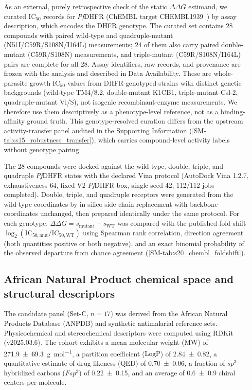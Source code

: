 \documentclass[11pt,a4paper]{article}
\begin{document}
As an external, purely retrospective check of the static $\Delta\Delta G$ estimand, we curated IC$_{50}$ records for \textit{Pf}DHFR (ChEMBL target CHEMBL1939~\citep{zdrazil2024chembl}) by assay description, which encodes the DHFR genotype. The curated set contains 28 compounds with paired wild-type and quadruple-mutant (N51I/C59R/S108N/I164L) measurements; 24 of them also carry paired double-mutant (C59R/S108N) measurements, and triple-mutant (C59R/S108N/I164L) pairs are complete for all 28. Assay identifiers, raw records, and provenance are frozen with the analysis and described in Data Availability. These are whole-parasite growth IC$_{50}$ values from DHFR-genotyped strains with distinct genetic backgrounds (wild-type TM4/8.2, double-mutant K1CB1, triple-mutant Csl-2, quadruple-mutant Vl/S), not isogenic recombinant-enzyme measurements. We therefore use them descriptively as a phenotype-level reference, not as a binding-affinity ground truth. This genotype-resolved curation differs from the upstream activity-transfer panel audited in the Supporting Information (\cref{SM-tab:s15_robustness_transfer}), which carries compound-level activity labels without genotype pairing.

The 28 compounds were docked against the wild-type, double, triple, and quadruple \textit{Pf}DHFR states with the declared Vina protocol (AutoDock Vina 1.2.7, exhaustiveness \num{64}, fixed V2 \textit{Pf}DHFR box, single seed \num{42}; \num{112}/\num{112} jobs completed). Double, triple, and quadruple receptors were generated from the wild-type coordinates by in silico side-chain replacement with backbone coordinates unchanged, then prepared identically under the same protocol. For each genotype, $\Delta\Delta G = s_{\mathrm{mutant}} - s_{\mathrm{WT}}$ was compared with the published fold-shift $\log_2(\mathrm{IC}_{50,\mathrm{mut}}/\mathrm{IC}_{50,\mathrm{WT}})$ using Spearman rank correlation, direction agreement (both quantities positive or both negative), and an exact binomial probability of the observed departure from chance agreement (\cref{SM-tab:s20_chembl_foldshift}).

\subsection{African Natural Product chemical space and structural descriptors}

The candidate panel (Set-C, $n=\num{17}$) was derived from the African Natural Products Database (ANPDB) and synthetic antimalarial reference sets. Physicochemical and stereochemical descriptors were computed using RDKit (v2025.03.6). The cohort exhibits a mean molecular weight ($\mathrm{MW}$) of \qty{271.9 \pm 69.3}{\g\per\mole}, a partition coefficient ($\mathrm{LogP}$) of \num{2.84 \pm 0.82}, a quantitative estimate of drug-likeness ($\mathrm{QED}$) of \num{0.70 \pm 0.06}, a fraction of $sp^3$-hybridized carbons ($Fsp^3$) of \num{0.22 \pm 0.15}, and an average of \num{0.6 \pm 0.9} chiral centers per molecule.
\end{document}
